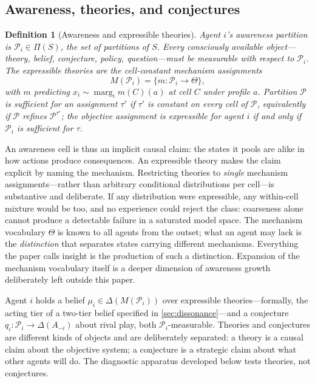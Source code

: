 \documentclass[11pt]{article}
\newtheorem{definition}[assumption]{Definition}
\theoremstyle{definition}
\newcommand{\marg}[1]{\operatorname{marg}_{#1}}
\begin{document}
\subsection{Awareness, theories, and conjectures}
\label{sec:awareness-sub}

\begin{definition}[Awareness and expressible theories]
\label{def:awareness}
Agent $i$'s awareness partition is $\mathcal P_i\in\Pi(S)$, the set of partitions of $S$.
Every consciously available object---theory, belief, conjecture, policy, question---must be measurable with respect to $\mathcal P_i$.
The \emph{expressible theories} are the cell-constant mechanism assignments
\begin{equation}
M(\mathcal P_i)=\{m:\mathcal P_i\to\Theta\},
\label{eq:expressible}
\end{equation}
with $m$ predicting $x_i\sim\marg{i}m(C)(a)$ at cell $C$ under profile $a$.
Partition $\mathcal P$ is \emph{sufficient} for an assignment $\tau'$ if $\tau'$ is constant on every cell of $\mathcal P$, equivalently if $\mathcal P$ refines $\mathcal P^{\tau'}$; the objective assignment is expressible for agent $i$ if and only if $\mathcal P_i$ is sufficient for $\tau$.
\end{definition}

An awareness cell is thus an implicit causal claim: the states it pools are alike in how actions produce consequences.
An expressible theory makes the claim explicit by naming the mechanism.
Restricting theories to \emph{single} mechanism assignments---rather than arbitrary conditional distributions per cell---is substantive and deliberate.
If any distribution were expressible, any within-cell mixture would be too, and no experience could reject the class: coarseness alone cannot produce a detectable failure in a saturated model space.
The mechanism vocabulary $\Theta$ is known to all agents from the outset; what an agent may lack is the \emph{distinction} that separates states carrying different mechanisms.
Everything the paper calls insight is the production of such a distinction.
Expansion of the mechanism vocabulary itself is a deeper dimension of awareness growth deliberately left outside this paper.

Agent $i$ holds a belief $\mu_i\in\Delta(M(\mathcal P_i))$ over expressible theories---formally, the acting tier of a two-tier belief specified in \cref{sec:dissonance}---and a conjecture $q_i:\mathcal P_i\to\Delta(A_{-i})$ about rival play, both $\mathcal P_i$-measurable.
Theories and conjectures are different kinds of objects and are deliberately separated: a theory is a causal claim about the objective system; a conjecture is a strategic claim about what other agents will do.
The diagnostic apparatus developed below tests theories, not conjectures.
\end{document}
